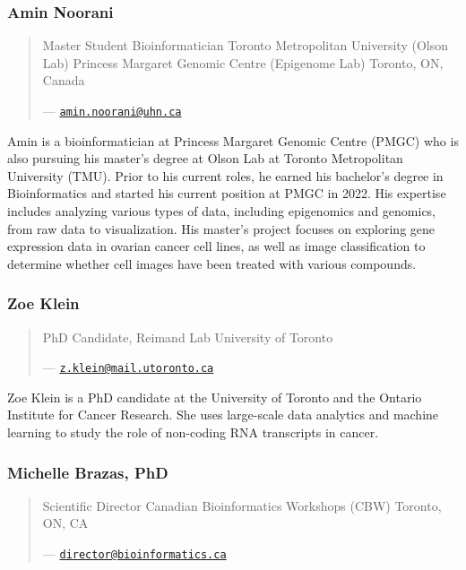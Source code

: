 \documentclass[
]{book}
\begin{document}
\subsubsection{Amin Noorani}\label{amin-noorani}

\begin{quote}
Master Student \textbar{} Bioinformatician
Toronto Metropolitan University (Olson Lab)
Princess Margaret Genomic Centre (Epigenome Lab)
Toronto, ON, Canada

--- \href{mailto:amin.noorani@uhn.ca}{\nolinkurl{amin.noorani@uhn.ca}}
\end{quote}

Amin is a bioinformatician at Princess Margaret Genomic Centre (PMGC) who is also
pursuing his master's degree at Olson Lab at Toronto Metropolitan University (TMU). Prior to
his current roles, he earned his bachelor's degree in Bioinformatics and started his current
position at PMGC in 2022. His expertise includes analyzing various types of data, including
epigenomics and genomics, from raw data to visualization. His master's project focuses on
exploring gene expression data in ovarian cancer cell lines, as well as image classification to
determine whether cell images have been treated with various compounds.

\subsubsection{Zoe Klein}\label{zoe-klein}

\begin{quote}
PhD Candidate, Reimand Lab
University of Toronto

--- \href{mailto:z.klein@mail.utoronto.ca}{\nolinkurl{z.klein@mail.utoronto.ca}}
\end{quote}

Zoe Klein is a PhD candidate at the University of Toronto and the Ontario Institute for Cancer
Research. She uses large-scale data analytics and machine learning to study the role of
non-coding RNA transcripts in cancer.

\subsubsection{Michelle Brazas, PhD}\label{michelle-brazas-phd}

\begin{quote}
Scientific Director
Canadian Bioinformatics Workshops (CBW)
Toronto, ON, CA

--- \href{mailto:director@bioinformatics.ca}{\nolinkurl{director@bioinformatics.ca}}
\end{quote}
\end{document}
